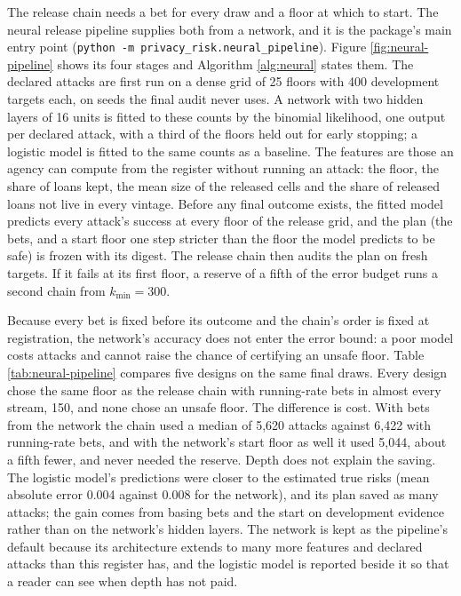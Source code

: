 \documentclass[11pt,a4paper]{article}
\theoremstyle{plain}
\theoremstyle{definition}
\theoremstyle{definition}
\theoremstyle{plain}
\begin{document}
The release chain needs a bet for every draw and a floor at which to start. The
neural release pipeline supplies both from a network, and it is the package's main
entry point (\texttt{python -m privacy\_risk.neural\_pipeline}). Figure
\ref{fig:neural-pipeline} shows its four stages and Algorithm \ref{alg:neural}
states them. The declared attacks are first run on a dense grid of 25 floors with
400 development targets each, on seeds the final audit never uses. A network with
two hidden layers of 16 units is fitted to these counts by the binomial
likelihood, one output per declared attack, with a third of the floors held out
for early stopping; a logistic model is fitted to the same counts as a baseline.
The features are those an agency can compute from the register without running an
attack: the floor, the share of loans kept, the mean size of the released cells
and the share of released loans not live in every vintage. Before any final
outcome exists, the fitted model predicts every attack's success at every floor of
the release grid, and the plan (the bets, and a start floor one step stricter than
the floor the model predicts to be safe) is frozen with its digest. The release
chain then audits the plan on fresh targets. If it fails at its first floor, a
reserve of a fifth of the error budget runs a second chain from $k_{\min} = 300$.

Because every bet is fixed before its outcome and the chain's order is fixed at
registration, the network's accuracy does not enter the error bound: a poor model
costs attacks and cannot raise the chance of certifying an unsafe floor. Table
\ref{tab:neural-pipeline} compares five designs on the same final draws. Every
design chose the same floor as the release chain with running-rate bets in almost
every stream, 150, and none chose an unsafe floor. The difference is cost. With
bets from the network the chain used a median of 5{,}620 attacks against 6{,}422
with running-rate bets, and with the network's start floor as well it used 5{,}044,
about a fifth fewer, and never needed the reserve. Depth does not explain the
saving. The logistic model's predictions were closer to the estimated true risks
(mean absolute error 0.004 against 0.008 for the network), and its plan saved as
many attacks; the gain comes from basing bets and the start on development
evidence rather than on the network's hidden layers. The network is kept as the
pipeline's default because its architecture extends to many more features and
declared attacks than this register has, and the logistic model is reported
beside it so that a reader can see when depth has not paid.
\end{document}
